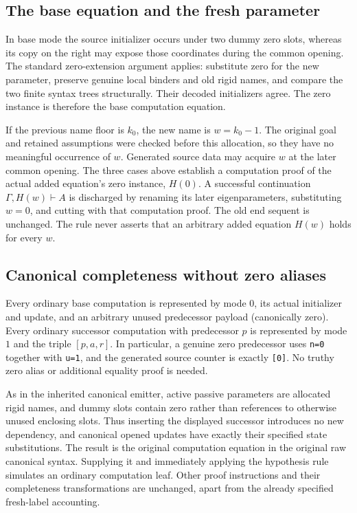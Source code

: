 \documentclass[11pt,letterpaper]{article}
\theoremstyle{definition}\newtheorem{definition}[theorem]{Definition}
\theoremstyle{remark}\newtheorem{remark}[theorem]{Remark}
\begin{document}
\subsection{The base equation and the fresh parameter}

In base mode the source initializer occurs under two dummy zero slots,
whereas its copy on the right may expose those coordinates during the
common opening.  The standard zero-extension argument applies: substitute
zero for the new parameter, preserve genuine local binders and old rigid
names, and compare the two finite syntax trees structurally.  Their
decoded initializers agree.  The zero instance is therefore the base
computation equation.

If the previous name floor is $k_0$, the new name is $w=k_0-1$.
The original goal and retained assumptions were checked before this
allocation, so they have no meaningful occurrence of $w$.  Generated
source data may acquire $w$ at the later common opening.  The three
cases above establish a computation proof of the actual added equation's
zero instance, $H(0)$.  A successful continuation
\(\Gamma,H(w)\vdash A\) is discharged by renaming its later
eigenparameters, substituting $w=0$, and cutting with that computation
proof.  The old end sequent is unchanged.  The rule never asserts that
an arbitrary added equation $H(w)$ holds for every $w$.

\subsection{Canonical completeness without zero aliases}

Every ordinary base computation is represented by mode $0$, its actual
initializer and update, and an arbitrary unused predecessor payload
(canonically zero).  Every ordinary successor computation with
predecessor $p$ is represented by mode $1$ and the triple $[p,a,r]$.
In particular, a genuine zero predecessor uses \texttt{n=0} together
with \texttt{u=1}, and the generated source counter is exactly
\texttt{[0]}.  No truthy zero alias or additional equality proof is
needed.

As in the inherited canonical emitter, active passive parameters are
allocated rigid names, and dummy slots contain zero rather than
references to otherwise unused enclosing slots.  Thus inserting the
displayed successor introduces no new dependency, and canonical opened
updates have exactly their specified state substitutions.  The result
is the original computation equation in the original raw canonical
syntax.  Supplying it and immediately applying the hypothesis rule
simulates an ordinary computation leaf.  Other proof instructions and
their completeness transformations are unchanged, apart from the
already specified fresh-label accounting.
\end{document}
